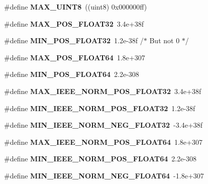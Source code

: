 \begin{DoxyCompactItemize}
\item 
\#define {\bfseries \-M\-A\-X\-\_\-\-U\-I\-N\-T8}~((uint8)  0x000000ff)\label{prim__type_8h_a05682ca8de174141447ff05a2289a27c}

\item 
\#define {\bfseries \-M\-A\-X\-\_\-\-P\-O\-S\-\_\-\-F\-L\-O\-A\-T32}~3.\-4e+38f\label{prim__type_8h_a763737bb762908f1014777705e1bd5e0}

\item 
\#define {\bfseries \-M\-I\-N\-\_\-\-P\-O\-S\-\_\-\-F\-L\-O\-A\-T32}~1.\-2e-\/38f	/$\ast$ But not 0 $\ast$/\label{prim__type_8h_a6ebe6d883694f66620b6d2dd94dc38e8}

\item 
\#define {\bfseries \-M\-A\-X\-\_\-\-P\-O\-S\-\_\-\-F\-L\-O\-A\-T64}~1.\-8e+307\label{prim__type_8h_a63f40e6ca19e802259413c04cc56bd28}

\item 
\#define {\bfseries \-M\-I\-N\-\_\-\-P\-O\-S\-\_\-\-F\-L\-O\-A\-T64}~2.\-2e-\/308\label{prim__type_8h_a2fc3595771a7d0f944470fd9ba07cfad}

\item 
\#define {\bfseries \-M\-A\-X\-\_\-\-I\-E\-E\-E\-\_\-\-N\-O\-R\-M\-\_\-\-P\-O\-S\-\_\-\-F\-L\-O\-A\-T32}~3.\-4e+38f\label{prim__type_8h_ab806e0c70417e38f2302635bbb78c8c5}

\item 
\#define {\bfseries \-M\-I\-N\-\_\-\-I\-E\-E\-E\-\_\-\-N\-O\-R\-M\-\_\-\-P\-O\-S\-\_\-\-F\-L\-O\-A\-T32}~1.\-2e-\/38f\label{prim__type_8h_a8b4a04ec8b6561c6f831dfd2434fd505}

\item 
\#define {\bfseries \-M\-I\-N\-\_\-\-I\-E\-E\-E\-\_\-\-N\-O\-R\-M\-\_\-\-N\-E\-G\-\_\-\-F\-L\-O\-A\-T32}~-\/3.\-4e+38f\label{prim__type_8h_a7dcce0312b93eb66d4e662fd035560bf}

\item 
\#define {\bfseries \-M\-A\-X\-\_\-\-I\-E\-E\-E\-\_\-\-N\-O\-R\-M\-\_\-\-P\-O\-S\-\_\-\-F\-L\-O\-A\-T64}~1.\-8e+307\label{prim__type_8h_a424bb3e6f9a39ec4d9f0ed965ab92026}

\item 
\#define {\bfseries \-M\-I\-N\-\_\-\-I\-E\-E\-E\-\_\-\-N\-O\-R\-M\-\_\-\-P\-O\-S\-\_\-\-F\-L\-O\-A\-T64}~2.\-2e-\/308\label{prim__type_8h_aa8adb129a54c32e19ba7cc9171779687}

\item 
\#define {\bfseries \-M\-I\-N\-\_\-\-I\-E\-E\-E\-\_\-\-N\-O\-R\-M\-\_\-\-N\-E\-G\-\_\-\-F\-L\-O\-A\-T64}~-\/1.\-8e+307\label{prim__type_8h_ad8550cd6490d48fd6f4949626084fbdb}


\end{DoxyCompactItemize}
